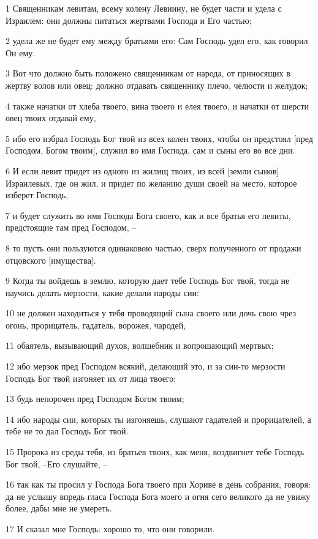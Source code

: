 \par 1 Священникам левитам, всему колену Левиину, не будет части и удела с Израилем: они должны питаться жертвами Господа и Его частью;
\par 2 удела же не будет ему между братьями его: Сам Господь удел его, как говорил Он ему.
\par 3 Вот что должно быть положено священникам от народа, от приносящих в жертву волов или овец: должно отдавать священнику плечо, челюсти и желудок;
\par 4 также начатки от хлеба твоего, вина твоего и елея твоего, и начатки от шерсти овец твоих отдавай ему,
\par 5 ибо его избрал Господь Бог твой из всех колен твоих, чтобы он предстоял [пред Господом, Богом твоим], служил во имя Господа, сам и сыны его во все дни.
\par 6 И если левит придет из одного из жилищ твоих, из всей [земли сынов] Израилевых, где он жил, и придет по желанию души своей на место, которое изберет Господь,
\par 7 и будет служить во имя Господа Бога своего, как и все братья его левиты, предстоящие там пред Господом, --
\par 8 то пусть они пользуются одинаковою частью, сверх полученного от продажи отцовского [имущества].
\par 9 Когда ты войдешь в землю, которую дает тебе Господь Бог твой, тогда не научись делать мерзости, какие делали народы сии:
\par 10 не должен находиться у тебя проводящий сына своего или дочь свою чрез огонь, прорицатель, гадатель, ворожея, чародей,
\par 11 обаятель, вызывающий духов, волшебник и вопрошающий мертвых;
\par 12 ибо мерзок пред Господом всякий, делающий это, и за сии-то мерзости Господь Бог твой изгоняет их от лица твоего;
\par 13 будь непорочен пред Господом Богом твоим;
\par 14 ибо народы сии, которых ты изгоняешь, слушают гадателей и прорицателей, а тебе не то дал Господь Бог твой.
\par 15 Пророка из среды тебя, из братьев твоих, как меня, воздвигнет тебе Господь Бог твой, --Его слушайте, --
\par 16 так как ты просил у Господа Бога твоего при Хориве в день собрания, говоря: да не услышу впредь гласа Господа Бога моего и огня сего великого да не увижу более, дабы мне не умереть.
\par 17 И сказал мне Господь: хорошо то, что они говорили.

